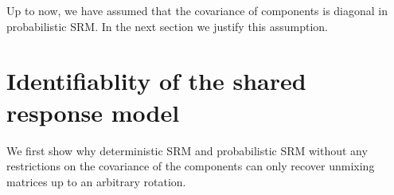 

  Up to now, we have assumed that the covariance of components is diagonal in
  probabilistic SRM. In the next section we justify this assumption.

\section{Identifiablity of the shared response model}
We first show why deterministic SRM and probabilistic SRM without any
restrictions on the covariance of the components can
only recover unmixing matrices up to an arbitrary rotation.

